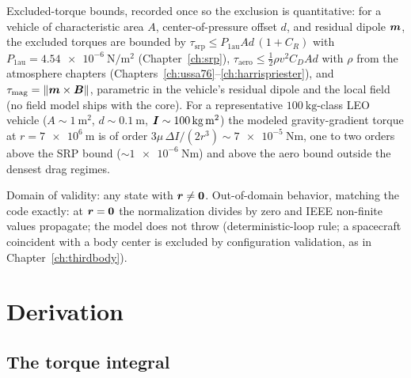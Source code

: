 Excluded-torque bounds, recorded once so the exclusion is quantitative:
for a vehicle of characteristic area $A$, center-of-pressure offset $d$,
and residual dipole $\bm{m}$, the excluded torques are bounded by
$\tau_{\mathrm{srp}} \le P_{1\mathrm{au}} A d\,(1 + C_R)$ with
$P_{1\mathrm{au}} = \qty{4.54e-6}{\newton\per\metre\squared}$
(Chapter~\ref{ch:srp}), $\tau_{\mathrm{aero}} \le \tfrac{1}{2}\rho v^2
C_D A d$ with $\rho$ from the atmosphere chapters
(Chapters~\ref{ch:ussa76}--\ref{ch:harrispriester}), and
$\tau_{\mathrm{mag}} = \left\lVert \bm{m} \times \bm{B} \right\rVert$, parametric in the
vehicle's residual dipole and the local field (no field model ships with
the core). For a representative $\qty{100}{\kilogram}$-class LEO vehicle
($A \sim \qty{1}{\metre\squared}$, $d \sim \qty{0.1}{\metre}$,
$\bm{I} \sim \qty{100}{\kilogram\metre\squared}$) the modeled
gravity-gradient torque at $r = \qty{7e6}{\metre}$ is of order
$3\mu\,\Delta I/(2 r^3) \sim \qty{7e-5}{\newton\metre}$, one to two orders
above the SRP bound ($\sim \qty{1e-6}{\newton\metre}$) and above the aero
bound outside the densest drag regimes.

Domain of validity: any state with $\bm{r} \neq \bm{0}$. Out-of-domain
behavior, matching the code exactly: at $\bm{r} = \bm{0}$ the
normalization divides by zero and IEEE non-finite values propagate; the
model does not throw (deterministic-loop rule; a spacecraft coincident
with a body center is excluded by configuration validation, as in
Chapter~\ref{ch:thirdbody}).

\section{Derivation}
\label{sec:gravgrad:derivation}

\subsection{The torque integral}

